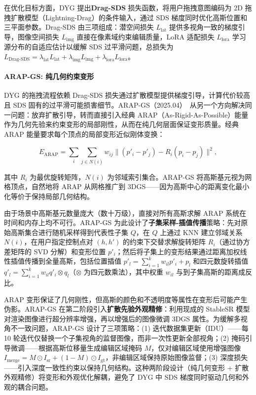 在优化目标方面，DYG 提出\textbf{Drag-SDS} 损失函数，将用户拖拽意图编码为 2D 拖拽扩散模型（Lightning-Drag）的条件输入，通过 SDS 梯度同时优化高斯位置和三平面参数。Drag-SDS 由三项组成：潜空间损失 $L_{\text{lat}}$ 提供多视角一致的梯度引导，图像空间损失 $L_{\text{img}}$ 直接在像素域约束编辑质量，LoRA 适配损失 $L_{\text{lora}}$ 学习源分布的自适应估计以缓解 SDS 过平滑问题，总损失为 $L_{\text{Drag-SDS}} = \lambda_{\text{lat}} L_{\text{lat}} + \lambda_{\text{img}} L_{\text{img}} + \lambda_{\text{lora}} L_{\text{lora}}$。

\paragraph{ARAP-GS: 纯几何约束变形}

DYG 的拖拽流程依赖 Drag-SDS 损失通过扩散模型提供梯度引导，计算代价较高且 SDS 固有的过平滑可能损害细节。ARAP-GS（2025.04）~\cite{2504_12788}从另一个方向解决同一问题：放弃扩散引导，转而直接引入经典 ARAP（As-Rigid-As-Possible）能量作为几何先验来约束变形的局部刚性，从而在纯几何层面保证变形质量。经典 ARAP 能量要求每个顶点的局部变形近似刚体变换：

\begin{equation}
E_{\text{ARAP}} = \sum_i \sum_{j \in N(i)} w_{ij} \| (p'_i - p'_j) - R_i (p_i - p_j) \|^2,
\end{equation}

其中 $R_i$ 为最优旋转矩阵，$N(i)$ 为邻域索引集合。ARAP-GS 将高斯基元视为网格顶点，自然地将 ARAP 从网格推广到 3DGS——因为高斯中心的距离变化最小化等价于保持局部几何结构。

由于场景中高斯基元数量庞大（数十万级），直接对所有高斯求解 ARAP 系统在时间和内存上均不可行。ARAP-GS 为此设计了\textbf{子集采样-插值传播}策略：先对原始高斯集合进行随机采样得到代表性子集 $Q$，在 $Q$ 上通过 KNN 建立邻域关系 $N(i)$，在用户指定控制点对 $(h, h')$ 的约束下交替求解旋转矩阵 $R_i$（通过协方差矩阵的 SVD 分解）和变形位置 $p'_i$；然后将子集上的变形结果通过距离加权线性插值传播到全量高斯，包括位置插值 $p'_l = \sum_{i=1}^k w_{il} p'_i + p_l$ 和四元数旋转插值 $q'_l = \sum_{i=1}^k w_{il} q'_i \otimes q_l$（$\otimes$ 为四元数乘法），其中权重 $w_{il}$ 与到子集高斯的距离成反比。

ARAP 变形保证了几何刚性，但高斯的颜色和不透明度等属性在变形后可能产生伪影。ARAP-GS 在第二阶段引入\textbf{扩散先验外观精修}：利用现成的 StableSR 模型对渲染图像进行超分辨率增强，再以增强后的图像微调 3DGS 属性。为缓解多视角不一致问题，ARAP-GS 设计了三项策略：(1) 迭代数据集更新（IDU）——每 10 轮迭代仅替换一个子集视角的监督图像，而非一次性更新全部视角；(2) 掩码引导微调——根据高斯位移量生成编辑区域掩码 $M$，仅对编辑区域使用增强图像 $I_{\text{merge}} = M \odot I_{\text{sr}} + (1-M) \odot I_{\text{gt}}$，非编辑区域保持原始图像监督；(3) 深度损失——引入深度一致性约束以保持几何结构。这种两阶段设计（纯几何变形 + 扩散外观精修）将变形和外观优化解耦，避免了 DYG 中 SDS 梯度同时驱动几何和外观的耦合问题。

